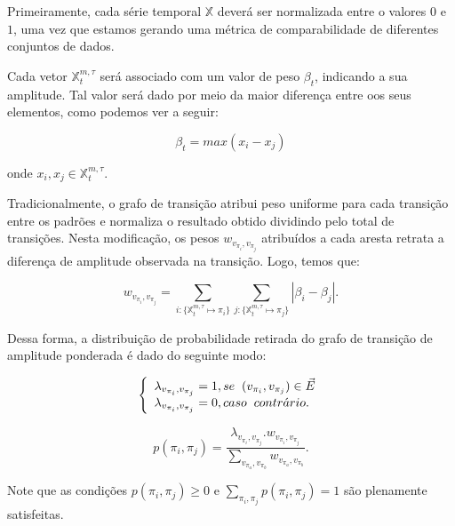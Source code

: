 \documentclass[12pt]{article}
\begin{document}
Primeiramente, cada série temporal $\mathbb{X}$ deverá ser normalizada entre o valores $0$ e $1$, uma vez que estamos gerando uma métrica de comparabilidade de diferentes conjuntos de dados.

Cada vetor $\mathbb{X}^{m, \tau}_t$ será associado com um valor de peso $\beta_t$, indicando a sua amplitude. 
Tal valor será dado por meio da maior diferença entre oos seus elementos, como podemos ver a seguir:

\begin{equation}
    \beta_t = max(x_i - x_j)
\end{equation}

onde $x_i, x_j \in \mathbb{X}^{m, \tau}_t$.

Tradicionalmente, o grafo de transição atribui peso uniforme para cada transição entre os padrões e normaliza o resultado obtido dividindo pelo total de transições.
Nesta modificação, os pesos $w_{v_{\pi_i}, v_{\pi_j}}$ atribuídos a cada aresta retrata a diferença de amplitude observada na transição.
Logo, temos que:

\begin{equation}
    w_{v_{\pi_i}, v_{\pi_j}} =  \sum_{i : \{\mathbb{X}^{m,\tau}_t \mapsto \pi_i\}} \sum_{j : \{\mathbb{X}^{m,\tau}_t \mapsto \pi_j\}} |\beta_i - \beta_j| .
\end{equation}

Dessa forma, a distribuição de probabilidade retirada do grafo de transição de amplitude ponderada é dado do seguinte modo:

\begin{equation}
    \left\{\begin{array}{l}
        \lambda_{v_{\pi_i}, v_{\pi_j}} = 1, se \hspace{.2cm} (v_{\pi_i}, v_{\pi_j}) \in \vec{E} \\
        \lambda_{v_{\pi_i}, v_{\pi_j}} = 0, caso \hspace{.2cm} contr\acute{a}rio.
        \end{array}\right.
\end{equation}

\begin{equation}
    p(\pi_i, \pi_j) = \frac{\lambda_{v_{\pi_i}, v_{\pi_j}} . w_{v_{\pi_i}, v_{\pi_j}}}{\sum_{v_{\pi_a}, v_{\pi_b}} w_{v_{\pi_a}, v_{\pi_b}}}.
\end{equation}

Note que as condições $p(\pi_i, \pi_j) \ge 0$ e $\sum_{\pi_i, \pi_j} p(\pi_i, \pi_j) = 1$ são plenamente satisfeitas.
\end{document}
